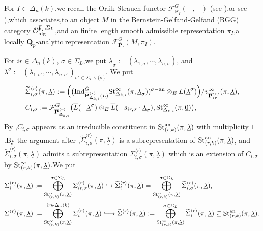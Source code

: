 \documentclass[SecEq,CM,GP]{degruyter-crelle} %
\theoremstyle{plain}
\newcommand{\hooklongrightarrow}{\lhook\joinrel\longrightarrow}
\newcommand{\ana}{{\rm an}}
\newcommand{\alge}{{\rm alg}}
\newcommand{\ind}{{\rm Ind}}
\newcommand{\lrr}{{\langle r\rangle}}
\newcommand{\op}{{\overline{{\mathbf{P}}}}}
\newcommand{\st}{{\rm St}}
\newcommand{\ul}{\underline}
\newcommand{\bQ}{{\mathbf{Q}}}
\newcommand{\cF}{\mathcal F}
\newcommand{\cO}{\mathcal O}
\newcommand{\fp}{{\mathfrak{p}}}
\begin{document}
For $I\subset \Delta_n(k)$,\;we recall the  Orlik-Strauch functor $\cF^{G}_{\op_{{I}}}(-,-)$ (see \cite[The main theorem]{orlik2015jordan}),\;or see \cite[Section 2]{breuil2016socle}),\;which associates,\;to an object $M$ in the Bernstein-Gelfand-Gelfand (BGG) category  $\cO_{\alge}^{\overline{\fp}_{{{I}}},\Sigma_L}$,\;and an finite length smooth admissible representation $\pi_I$,\;a locally $\bQ_p$-analytic representation $\cF^{G}_{\op_{{I}}}(M,\pi_I)$.\;

For  $ir\in {\Delta_n(k)}$, $\sigma\in \Sigma_L$,\;we put $\ul{\lambda}_{\sigma}:=(\lambda_{1,\sigma}, \cdots, \lambda_{n,\sigma})$, and $\ul{\lambda}^{\sigma}:=(\lambda_{1,\sigma'}, \cdots, \lambda_{n,\sigma'})_{\sigma'\in \Sigma_L\backslash\{\sigma\}}$. We put
\begin{equation*}
\begin{aligned}
	& \widetilde{\Sigma}^{\lrr}_{i,\sigma}(\pi,\ul{\lambda}):=\Big(\big(\ind_{\op^{\lrr}_{{\Delta}_{k,i}}(L)}^G \st_{{\Delta}_{k,i}}^{\infty}(\pi,\ul{\lambda}_{\sigma}) )^{\sigma-\ana}\otimes_E L(\ul{\lambda}^{\sigma})\Big)/v_{\op^{\lrr}_{{ir}}}^{\infty}(\pi,\ul{\lambda}),\\
	&	C_{i,\sigma}:=\cF_{\op^{\lrr}_{{\Delta}_{k,i}}}^G\big(\overline{L}(-\ul{\lambda}^{\sigma})\otimes_E \overline{L}(-s_{ir,\sigma}\cdot \ul{\lambda}_{\sigma}), \st_{{\Delta}_{k,i}}^{\infty}(\pi,\ul{0})\big),
\end{aligned}
\end{equation*}
By \cite[Proposition 4.6 and Proposition 4.9]{2022ext1hyq},\;$C_{i,\sigma}$ appears as an irreducible constituent in $\st_{(r,k)}^{\ana}(\pi,\ul{\lambda})$
with  multiplicity $1$.\;By the argument after \cite[(5.48)]{2022ext1hyq},\;$\widetilde{\Sigma}^{\lrr}_{i,\sigma}(\pi,\ul{\lambda})$ is a subrepresentation of $\st_{(r,k)}^{\ana}(\pi,\ul{\lambda})$, and $\widetilde{\Sigma}^{\lrr}_{i,\sigma}(\pi,\ul{\lambda})$ admits a subrepresentation $\Sigma_{i,\sigma}^{\lrr}(\pi,\ul{\lambda})$ which is an extension of $C_{i,\sigma}$ by $\st_{(r,k)}^{\infty}(\pi,\ul{\lambda})$.\;We put
\begin{equation}\label{subofsigma}
\begin{aligned}
	&\Sigma_i^{\lrr}(\pi,\ul{\lambda}):=\bigoplus^{\sigma\in \Sigma_L}_{\st_{(r,k)}^{\infty}(\pi,\ul{\lambda})}\Sigma_{ir,\sigma}^{\lrr}(\pi,\ul{\lambda})\hookrightarrow \widetilde{\Sigma}^{\lrr}_{i}(\pi,\ul{\lambda})=\bigoplus^{\sigma\in \Sigma_L}_{\st_{(r,k)}^{\infty}(\pi,\ul{\lambda})}\widetilde\Sigma_{i,\sigma}^{\lrr}(\pi,\ul{\lambda}),\\
	& \Sigma^{\lrr}(\pi,\ul{\lambda}):=\bigoplus^{ir\in {\Delta_n(k)}}_{\st_{(r,k)}^{\infty}(\pi,\ul{\lambda})} \Sigma_i^{\lrr}(\pi,\ul{\lambda})
	\hooklongrightarrow\widetilde{\Sigma}^{\lrr}(\pi,\ul{\lambda}):=\bigoplus^{\sigma\in \Sigma_L}_{\st_{(r,k)}^{\infty}(\pi,\ul{\lambda})}\widetilde{\Sigma}^{\lrr}_{i}(\pi,\ul{\lambda})\subseteq\st_{(r,k)}^{\ana}(\pi,\underline{\lambda}).
\end{aligned}
\end{equation}
\end{document}
